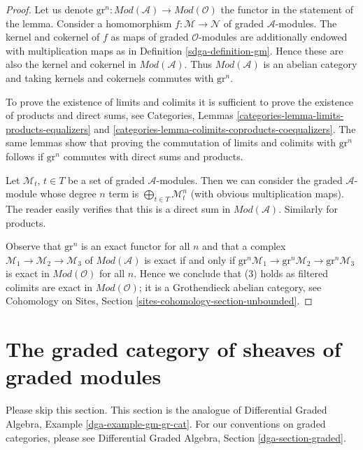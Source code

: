 \begin{proof}

Let us denote
$\text{gr}^n : \textit{Mod}(\mathcal{A}) \to \textit{Mod}(\mathcal{O})$
the functor in the statement of the lemma.
Consider a homomorphism $f : \mathcal{M} \to \mathcal{N}$
of graded $\mathcal{A}$-modules. The kernel
and cokernel of $f$ as maps of graded $\mathcal{O}$-modules
are additionally endowed with multiplication maps as in
Definition \ref{sdga-definition-gm}. Hence these are also
the kernel and cokernel in $\textit{Mod}(\mathcal{A})$.
Thus $\textit{Mod}(\mathcal{A})$ is an abelian category
and taking kernels and cokernels commutes with $\text{gr}^n$.

\medskip\noindent
To prove the existence of limits and colimits it is sufficient
to prove the existence of products and direct sums, see
Categories, Lemmas \ref{categories-lemma-limits-products-equalizers} and
\ref{categories-lemma-colimits-coproducts-coequalizers}.
The same lemmas show that
proving the commutation of limits and colimits with $\text{gr}^n$
follows if $\text{gr}^n$ commutes with direct sums and products.

\medskip\noindent
Let $\mathcal{M}_t$, $t \in T$ be a set of graded $\mathcal{A}$-modules.
Then we can consider the graded $\mathcal{A}$-module whose degree $n$
term is $\bigoplus_{t \in T} \mathcal{M}_t^n$ (with obvious multiplication
maps). The reader easily verifies that this is a direct sum in
$\textit{Mod}(\mathcal{A})$. Similarly for products.

\medskip\noindent
Observe that $\text{gr}^n$ is an exact functor for all $n$ and that
a complex $\mathcal{M}_1 \to \mathcal{M}_2 \to \mathcal{M}_3$
of $\textit{Mod}(\mathcal{A})$ is exact if and only if
$\text{gr}^n\mathcal{M}_1 \to \text{gr}^n\mathcal{M}_2 \to
\text{gr}^n\mathcal{M}_3$ is exact in $\textit{Mod}(\mathcal{O})$
for all $n$. Hence we conclude that (3) holds as filtered
colimits are exact in $\textit{Mod}(\mathcal{O})$;
it is a Grothendieck abelian category, see
Cohomology on Sites, Section \ref{sites-cohomology-section-unbounded}.
\end{proof}

\section{The graded category of sheaves of graded modules}
\label{sdga-section-gm-gr-cat}
Please skip this section. This section is the analogue of
Differential Graded Algebra, Example \ref{dga-example-gm-gr-cat}.
For our conventions on graded categories, please see
Differential Graded Algebra, Section \ref{dga-section-graded}.

